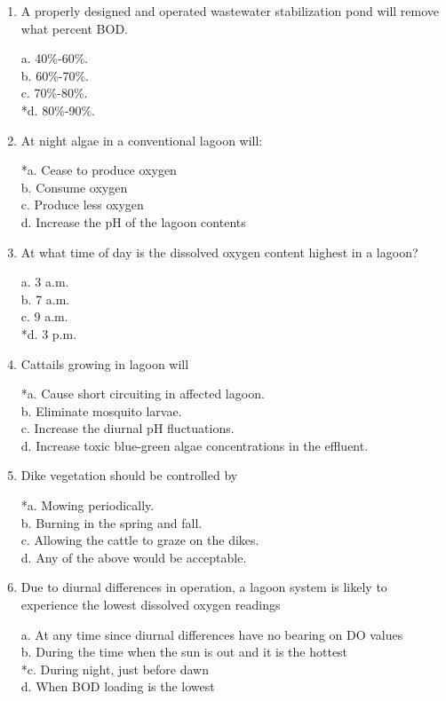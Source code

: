 \begin{enumerate}
\item  A properly designed and operated wastewater stabilization pond will remove what percent BOD. 

a. 40\%-60\%. \\
b. 60\%-70\%. \\
c. 70\%-80\%. \\
*d. 80\%-90\%. 


\item  At night algae in a conventional lagoon will: 

*a. Cease to produce oxygen \\
b. Consume oxygen \\
c. Produce less oxygen \\
d. Increase the pH of the lagoon contents 


\item  At what time of day is the dissolved oxygen content highest in a lagoon? 

a. 3 a.m. \\
b. 7 a.m. \\
c. 9 a.m. \\
*d. 3 p.m. 


\item  Cattails growing in lagoon will 

*a. Cause short circuiting in affected lagoon. \\
b. Eliminate mosquito larvae. \\
c. Increase the diurnal pH fluctuations. \\
d. Increase toxic blue-green algae concentrations in the effluent. 


\item  Dike vegetation should be controlled by 

*a. Mowing periodically. \\
b. Burning in the spring and fall. \\
c. Allowing the cattle to graze on the dikes. \\
d. Any of the above would be acceptable. 


\item  Due to diurnal differences in operation, a lagoon system is likely to experience the lowest dissolved oxygen readings 

a. At any time since diurnal differences have no bearing on DO values \\
b. During the time when the sun is out and it is the hottest \\
*c. During night, just before dawn \\
d. When BOD loading is the lowest 



\end{enumerate}
